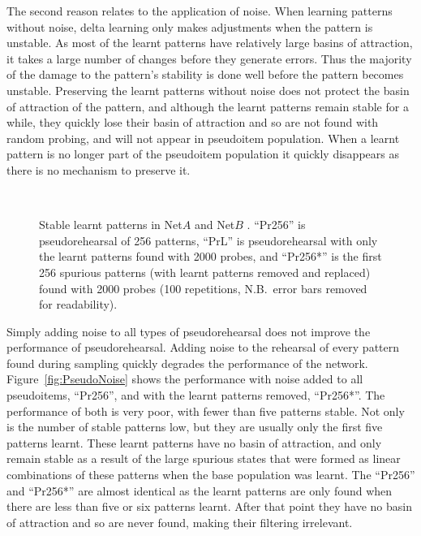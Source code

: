 The second reason relates to the application of noise.  When learning patterns without noise, delta learning only makes adjustments when the pattern is unstable.  As most of the learnt patterns have relatively large basins of attraction, it takes a large number of changes before they generate errors.  Thus the majority of the damage to the pattern's stability is done well before the pattern becomes unstable.  Preserving the learnt patterns without noise does not protect the basin of attraction of the pattern, and although the learnt patterns remain stable for a while, they quickly lose their basin of attraction and so are not found with random probing, and will not appear in  pseudoitem population.  When a learnt pattern is no longer part of the pseudoitem population it quickly disappears as there is no mechanism to preserve it.


\begin{figure}[p]
\center
\small
	
	\vspace{1cm}\\
	
	\caption{Stable learnt patterns in Net$A$  and Net$B$ . ``Pr256'' is pseudorehearsal of 256 patterns, ``PrL'' is  pseudorehearsal with only the learnt patterns found with 2000 probes, and ``Pr256*'' is the first 256 spurious patterns (with learnt patterns removed and replaced) found with 2000 probes (100 repetitions, N.B.\ error bars removed for readability).}
	\label{fig:PR-nonoise}
\end{figure}

Simply adding noise to all types of pseudorehearsal does not improve the performance of pseudorehearsal.  Adding noise to the rehearsal of every pattern found during sampling quickly degrades the performance of the network.  Figure~\ref{fig:PseudoNoise} shows the performance with noise added to all pseudoitems, ``Pr256\noiseConst{}'', and with the learnt patterns removed, ``Pr256*\noiseConst{}''.  The performance of both is very poor, with fewer than five patterns stable.  Not only is the number of stable patterns low, but they are usually only the first five patterns learnt.  These learnt patterns have no basin of attraction, and only remain stable as a result of the large spurious states that were formed as linear combinations of these patterns when the base population was learnt.  The ``Pr256\noiseConst{}'' and ``Pr256*\noiseConst{}'' are almost identical as the learnt patterns are only found when there are less than five or six patterns learnt.  After that point they have no basin of attraction and so are never found, making their filtering irrelevant.

